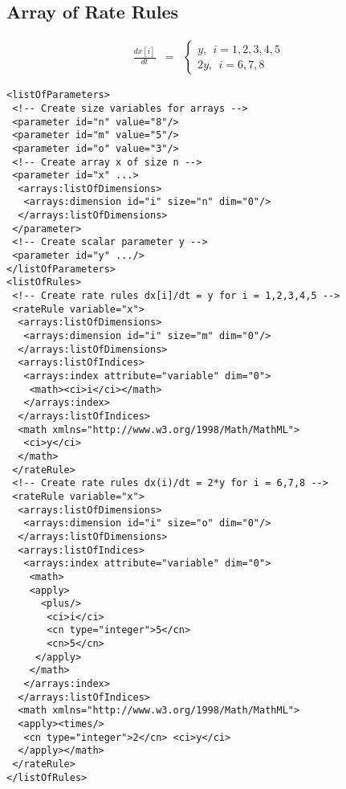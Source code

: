 

\subsection{Array of Rate Rules}

\begin{eqnarray*}
\frac{dx[i]}{dt} & = & \left\{ \begin{array}{l}
  y,~~i = 1,2,3,4,5 \\
 2y,~~i = 6, 7, 8 
\end{array}
\right.
\end{eqnarray*}
\begin{verbatim}
<listOfParameters>
 <!-- Create size variables for arrays -->
 <parameter id="n" value="8"/>
 <parameter id="m" value="5"/>
 <parameter id="o" value="3"/>
 <!-- Create array x of size n -->
 <parameter id="x" ...> 
  <arrays:listOfDimensions>
   <arrays:dimension id="i" size="n" dim="0"/>
  </arrays:listOfDimensions>
 </parameter>
 <!-- Create scalar parameter y -->
 <parameter id="y" .../>
</listOfParameters>
<listOfRules>
 <!-- Create rate rules dx[i]/dt = y for i = 1,2,3,4,5 -->
 <rateRule variable="x">
  <arrays:listOfDimensions>
   <arrays:dimension id="i" size="m" dim="0"/>
  </arrays:listOfDimensions>
  <arrays:listOfIndices>
   <arrays:index attribute="variable" dim="0">
    <math><ci>i</ci></math>
   </arrays:index>
  </arrays:listOfIndices>
  <math xmlns="http://www.w3.org/1998/Math/MathML">
   <ci>y</ci>
  </math>
 </rateRule>
 <!-- Create rate rules dx(i)/dt = 2*y for i = 6,7,8 -->
 <rateRule variable="x">
  <arrays:listOfDimensions>
   <arrays:dimension id="i" size="o" dim="0"/>
  </arrays:listOfDimensions>
  <arrays:listOfIndices>
   <arrays:index attribute="variable" dim="0">
    <math>
    <apply>
      <plus/>
       <ci>i</ci>
       <cn type="integer">5</cn>
       <cn>5</cn>
     </apply>
    </math>
   </arrays:index>
  </arrays:listOfIndices>
  <math xmlns="http://www.w3.org/1998/Math/MathML">
  <apply><times/>
   <cn type="integer">2</cn> <ci>y</ci>
  </apply></math> 
 </rateRule>
</listOfRules>
\end{verbatim}

